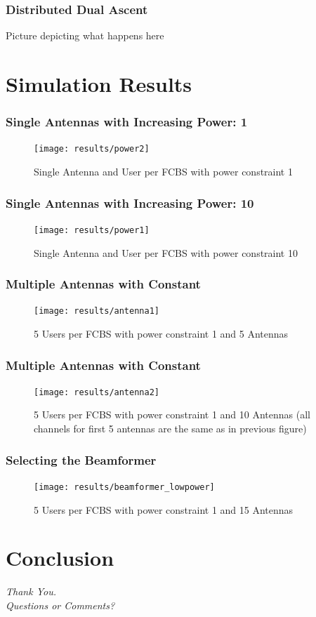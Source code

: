 \documentclass[10pt,tgadventor, onlymath]{beamer}
\begin{document}
\begin{frame}
\frametitle{Distributed Dual Ascent}
Picture depicting what happens here
\end{frame}

\section{Simulation Results}
\begin{frame}
\frametitle{Single Antennas with Increasing Power: 1}
\begin{figure}
	\texttt{[image: results/power2]}
\caption{Single Antenna and User per FCBS with power constraint 1}
\end{figure}

\end{frame}
\begin{frame}
\frametitle{Single Antennas with Increasing Power: 10}
\begin{figure}
	\texttt{[image: results/power1]}
	\caption{Single Antenna and User per FCBS with power constraint 10}
\end{figure}
\end{frame}


\begin{frame}
\frametitle{Multiple Antennas with Constant}
\begin{figure}
	\texttt{[image: results/antenna1]}
	\caption{5 Users per FCBS with power constraint 1 and 5 Antennas}
\end{figure}
\end{frame}

\begin{frame}
\frametitle{Multiple Antennas with Constant}
\begin{figure}
	\texttt{[image: results/antenna2]}
	\caption{5 Users per FCBS with power constraint 1 and 10 Antennas (all channels for first 5 
	antennas are the same as in previous figure)}
\end{figure}
\end{frame}

\begin{frame}
\frametitle{Selecting the Beamformer}
\begin{figure}
	\texttt{[image: results/beamformer\_lowpower]}
\caption{5 Users per FCBS with power constraint 1 and 15 Antennas }\end{figure}
\end{frame}

\section{Conclusion}

\begin{frame}
  \centering \Large
  \emph{Thank You.}
  \\
	\bigskip
    \centering \Large
  \emph{Questions or Comments?}

\end{frame}
\end{document}
